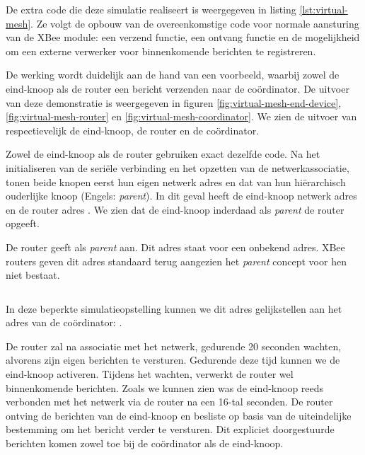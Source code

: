 De extra code die deze simulatie realiseert is weergegeven in listing
\ref{lst:virtual-mesh}. Ze volgt de opbouw van de overeenkomstige code voor
normale aansturing van de XBee module: een verzend functie, een ontvang functie
en de mogelijkheid om een externe verwerker voor binnenkomende berichten te
registreren.

De werking wordt duidelijk aan de hand van een voorbeeld, waarbij zowel de
eind-knoop als de router een bericht verzenden naar de co\"ordinator. De
uitvoer van deze demonstratie is weergegeven in figuren
\ref{fig:virtual-mesh-end-device}, \ref{fig:virtual-mesh-router} en
\ref{fig:virtual-mesh-coordinator}. We zien de uitvoer van respectievelijk de
eind-knoop, de router en de co\"ordinator.

Zowel de eind-knoop als de router gebruiken exact dezelfde code. Na het
initialiseren van de seri\"ele verbinding en het opzetten van de
netwerkassociatie, tonen beide knopen eerst hun eigen netwerk adres en dat van
hun hi\"erarchisch ouderlijke knoop (Engels: \emph{parent}). In dit geval heeft
de eind-knoop netwerk adres  en de router adres . We zien
dat de eind-knoop inderdaad als \emph{parent} de router opgeeft.

De router geeft als \emph{parent}  aan. Dit adres staat voor een
onbekend adres. XBee routers geven dit adres standaard terug aangezien het
\emph{parent} concept voor hen niet bestaat. 

\inputminted[linenos,frame=lines,framesep=2mm,fontsize=\footnotesize,firstline=11, firstnumber=11]{c}{../src/demo/lib/network.c}
\vspace{-5mm}
\vspace{3mm}

In deze beperkte simulatieopstelling kunnen we dit adres gelijkstellen aan het
adres van de co\"ordinator: .

De router zal na associatie met het netwerk, gedurende 20 seconden wachten,
alvorens zijn eigen berichten te versturen. Gedurende deze tijd kunnen we de
eind-knoop activeren. Tijdens het wachten, verwerkt de router wel binnenkomende
berichten. Zoals we kunnen zien was de eind-knoop reeds verbonden met het
netwerk via de router na een 16-tal seconden. De router ontving de berichten
van de eind-knoop en besliste op basis van de uiteindelijke bestemming om het
bericht verder te versturen. Dit expliciet doorgestuurde berichten komen zowel
toe bij de co\"ordinator als de eind-knoop.

